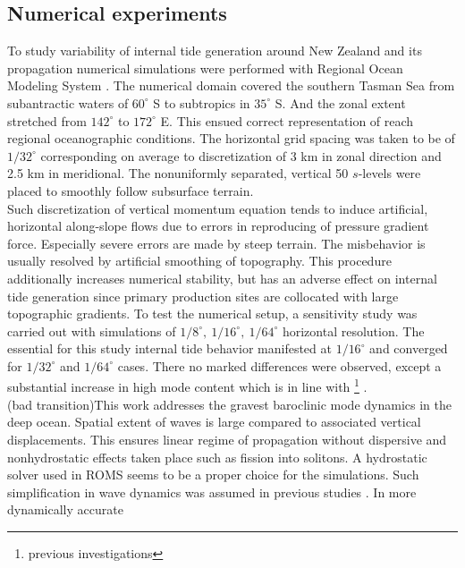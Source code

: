 \documentclass[12pt]{article}
\begin{document}
\subsection{Numerical experiments}
To study variability of internal tide generation around New Zealand and its propagation numerical 
simulations were performed with Regional Ocean Modeling System \citep{shchepetkin2005regional}. 
The numerical domain covered the southern Tasman Sea from subantractic waters of $60^{\circ}$ S 
to subtropics in $35^{\circ}$ S. And the zonal extent stretched from $142^{\circ}$ to $172^{\circ}$ 
E. This ensued correct representation of reach regional oceanographic conditions. The horizontal 
grid spacing was taken to be of $1/32^{\circ}$ corresponding on average to discretization of 3 km 
in zonal direction and 2.5 km in meridional. The nonuniformly separated, vertical 50 $s$-levels 
were placed to smoothly follow subsurface terrain.\\
Such discretization of vertical momentum equation tends to induce artificial, horizontal  
along-slope flows \citep{haidvogel1999numerical} due to errors in reproducing of pressure 
gradient force. Especially severe errors are made by steep terrain. The misbehavior is usually 
resolved by artificial smoothing of topography. This procedure additionally increases numerical 
stability, but has an adverse effect on internal tide generation \citep{di2006numerical} since 
primary production sites are collocated with large topographic gradients. To test the numerical 
setup, a sensitivity study was carried out with simulations of 
$1/8^{\circ},~1/16^{\circ},~1/64^{\circ}$ horizontal resolution. The essential for this study 
internal tide behavior manifested at $1/16^{\circ}$ and converged for $1/32^{\circ}$ and 
$1/64^{\circ}$ cases. There no marked differences were observed, except a substantial increase in 
high mode content which is in line with \footnote{previous investigations} 
\citep{di2006numerical}.\\
(bad transition)This work addresses the gravest baroclinic mode dynamics in the deep ocean. Spatial 
extent of 
waves is large compared to associated vertical displacements. This ensures linear regime of 
propagation without dispersive and nonhydrostatic effects taken place such as fission into 
solitons. A hydrostatic solver used in ROMS seems to be a proper choice for the simulations. Such 
simplification in wave dynamics was assumed in previous studies \citep{carter2008energetics, 
merrifield2001generation,  merrifield2002model, kerry2013effects}. In more dynamically accurate   
\end{document}
